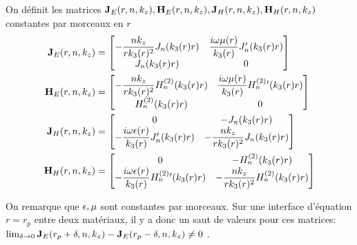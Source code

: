   \begin{defn}
    \label{def:cylindre:JE-JH-HE-HH}
    On définit les matrices \(\mathbf{J}_{E}(r,n,k_z),\mathbf{H}_{E}(r,n,k_z),\mathbf{J}_{H}(r,n,k_z),\mathbf{H}_{H}(r,n,k_z)\) constantes par morceaux en \(r\)
    \begin{align*}
      \mathbf{J}_{E}(r,n,k_z) &=
      \begin{bmatrix}
        -\dfrac{nk_z}{rk_3(r)^2}J_n(k_3(r)r) & \dfrac{i\omega\mu(r)}{k_3(r)}J_n'(k_3(r)r)
        \\
        J_n(k_3(r)r) & 0
      \end{bmatrix}
      \\
      \mathbf{H}_{E}(r,n,k_z) &=
      \begin{bmatrix}
        -\dfrac{nk_z}{rk_3(r)^2}H_n^{(2)}(k_3(r)r) & \dfrac{i\omega\mu(r)}{k_3(r)}H_n^{(2)}{}'(k_3(r)r)
        \\
        H_n^{(2)}(k_3(r)r) & 0
      \end{bmatrix}
      \\
      \mathbf{J}_{H}(r,n,k_z) &=
      \begin{bmatrix}
        0 & -J_n(k_3(r)r)
        \\
        -\dfrac{i\omega\epsilon(r)}{k_3(r)}J_n'(k_3(r)r) & -\dfrac{nk_z}{rk_3(r)^2}J_n(k_3(r)r)
      \end{bmatrix}
      \\
      \mathbf{H}_{H}(r,n,k_z) &=
      \begin{bmatrix}
        0 & -H_n^{(2)}(k_3(r)r)
        \\
        -\dfrac{i\omega\epsilon(r)}{k_3(r)}H_n^{(2)}{}'(k_3(r)r) & -\dfrac{nk_z}{rk_3(r)^2}H_n^{(2)}(k_3(r)r)
      \end{bmatrix}
    \end{align*}
  \end{defn}

  On remarque que \(\epsilon,\mu\) sont constantes par morceaux.
  Sur une interface d'équation \(r=r_p\) entre deux matériaux, il y a donc un saut de valeurs pour ces matrices: \(\lim_{\delta\rightarrow 0 } \mathbf{J}_E(r_p+ \delta,n,k_z) - \mathbf{J}_E(r_p - \delta,n,k_z) \not = 0\) .

